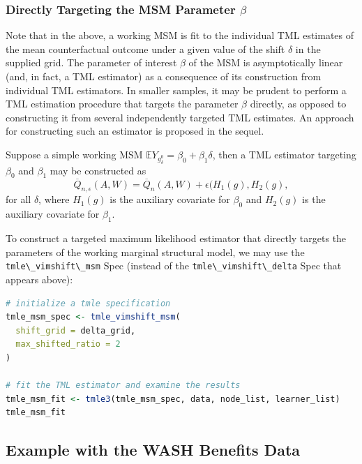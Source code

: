 \documentclass[
  12pt, krantz2,
]{krantz}
\newcommand{\passthrough}[1]{#1}
\theoremstyle{definition}
\theoremstyle{definition}
\theoremstyle{definition}
\newcommand{\1}{\mathbbm{1}}
\begin{document}
\hypertarget{directly-targeting-the-msm-parameter-beta}{%
\subsubsection{\texorpdfstring{Directly Targeting the MSM Parameter \(\beta\)}{Directly Targeting the MSM Parameter \textbackslash beta}}\label{directly-targeting-the-msm-parameter-beta}}

Note that in the above, a working MSM is fit to the individual TML estimates of
the mean counterfactual outcome under a given value of the shift \(\delta\) in the
supplied grid. The parameter of interest \(\beta\) of the MSM is asymptotically
linear (and, in fact, a TML estimator) as a consequence of its construction from
individual TML estimators. In smaller samples, it may be prudent to perform a
TML estimation procedure that targets the parameter \(\beta\) directly, as opposed
to constructing it from several independently targeted TML estimates. An
approach for constructing such an estimator is proposed in the sequel.

Suppose a simple working MSM \(\mathbb{E}Y_{g^0_{\delta}} = \beta_0 + \beta_1 \delta\), then a TML estimator targeting \(\beta_0\) and \(\beta_1\) may be
constructed as
\[\overline{Q}_{n, \epsilon}(A,W) = \overline{Q}_n(A,W) + \epsilon (H_1(g),
H_2(g),\] for all \(\delta\), where \(H_1(g)\) is the auxiliary covariate for
\(\beta_0\) and \(H_2(g)\) is the auxiliary covariate for \(\beta_1\).

To construct a targeted maximum likelihood estimator that directly targets the
parameters of the working marginal structural model, we may use the
\passthrough{\lstinline!tmle\_vimshift\_msm!} Spec (instead of the \passthrough{\lstinline!tmle\_vimshift\_delta!} Spec that
appears above):

\begin{lstlisting}[language=R]
# initialize a tmle specification
tmle_msm_spec <- tmle_vimshift_msm(
  shift_grid = delta_grid,
  max_shifted_ratio = 2
)

# fit the TML estimator and examine the results
tmle_msm_fit <- tmle3(tmle_msm_spec, data, node_list, learner_list)
tmle_msm_fit
\end{lstlisting}

\hypertarget{example-with-the-wash-benefits-data}{%
\subsection{Example with the WASH Benefits Data}\label{example-with-the-wash-benefits-data}}
\end{document}
